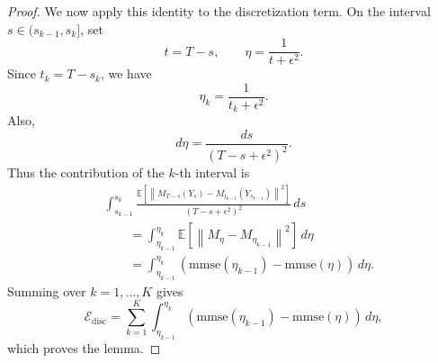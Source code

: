 \documentclass[11pt]{article}
\newcommand{\E}{\mathbb{E}}
\newcommand{\mmse}{\mathrm{mmse}}
\newcommand{\eps}{\epsilon}
\newcommand{\norm}[1]{\left\lVert #1 \right\rVert}
\begin{document}
\begin{proof}
We now apply this identity to the discretization term. On the interval
\(s\in(s_{k-1},s_k]\), set
\[
    t=T-s,
    \qquad
    \eta=\frac{1}{t+\eps^2}.
\]
Since \(t_k=T-s_k\), we have
\[
    \eta_k=\frac{1}{t_k+\eps^2}.
\]
Also,
\[
    d\eta
    =
    \frac{ds}{(T-s+\eps^2)^2}.
\]
Thus the contribution of the \(k\)-th interval is
\[
\begin{aligned}
    &\int_{s_{k-1}}^{s_k}
    \frac{
    \E\!\left[
    \norm{
    M_{T-s}(Y_s)-M_{t_{k-1}}(Y_{s_{k-1}})
    }^2
    \right]
    }{(T-s+\eps^2)^2}\,ds  \\
    &\qquad =
    \int_{\eta_{k-1}}^{\eta_k}
    \E\!\left[
    \norm{
    M_\eta-M_{\eta_{k-1}}
    }^2
    \right]\,d\eta  \\
    &\qquad =
    \int_{\eta_{k-1}}^{\eta_k}
    \left(
    \mmse(\eta_{k-1})-\mmse(\eta)
    \right)\,d\eta .
\end{aligned}
\]
Summing over \(k=1,\dots,K\) gives
\[
    \mathcal E_{\mathrm{disc}}
    =
    \sum_{k=1}^K
    \int_{\eta_{k-1}}^{\eta_k}
    \left(
    \mmse(\eta_{k-1})-\mmse(\eta)
    \right)\,d\eta,
\]
which proves the lemma.
\end{proof}
\end{document}
